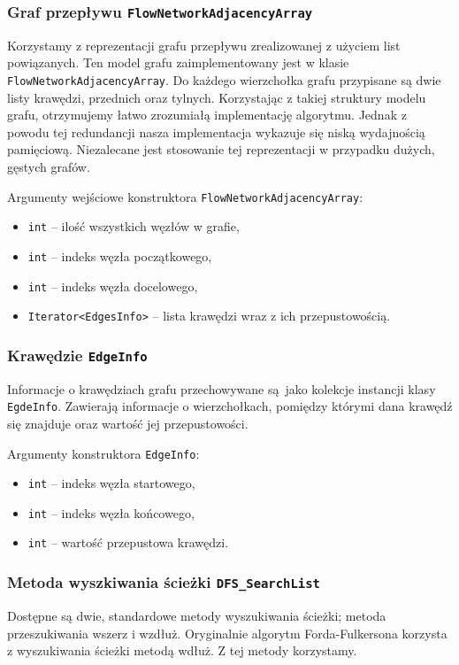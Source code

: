 \documentclass[10pt]{dokument-tiwo}
\begin{document}
\subsubsection{Graf przepływu \texttt{FlowNetworkAdjacencyArray}}
Korzystamy z reprezentacji grafu przepływu zrealizowanej z użyciem list
powiązanych. Ten model grafu zaimplementowany jest w klasie
\texttt{FlowNetworkAdjacencyArray}. Do każdego wierzchołka grafu przypisane są
dwie listy krawędzi, przednich oraz tylnych. Korzystając z takiej struktury
modelu grafu, otrzymujemy łatwo zrozumiałą implementację algorytmu. Jednak z
powodu tej redundancji nasza implementacja wykazuje się niską wydajnością
pamięciową. Niezalecane jest stosowanie tej reprezentacji w przypadku dużych,
gęstych grafów.

\noindent
Argumenty wejściowe konstruktora \texttt{FlowNetworkAdjacencyArray}:
\begin{itemize}[nosep]
  \item \texttt{int} -- ilość wszystkich węzłów w grafie,
  \item \texttt{int} -- indeks węzła początkowego,
  \item \texttt{int} -- indeks węzła docelowego,
  \item \texttt{Iterator<EdgesInfo>} -- lista krawędzi wraz z ich przepustowością.
\end{itemize}

\subsubsection{Krawędzie \texttt{EdgeInfo}}
Informacje o krawędziach grafu przechowywane są jako kolekcje instancji klasy
\texttt{EgdeInfo}. Zawierają informacje o wierzchołkach, pomiędzy którymi
dana krawędź się znajduje oraz wartość jej przepustowości.

\noindent
Argumenty konstruktora \texttt{EdgeInfo}:
\begin{itemize}[nosep]
  \item \texttt{int} -- indeks węzła startowego,
  \item \texttt{int} -- indeks węzła końcowego,
  \item \texttt{int} -- wartość przepustowa krawędzi.
\end{itemize}

\subsubsection{Metoda wyszkiwania ścieżki \texttt{DFS\_SearchList}}
Dostępne są dwie, standardowe metody wyszukiwania ścieżki; metoda przeszukiwania
wszerz i wzdłuż. Oryginalnie algorytm Forda-Fulkersona korzysta z wyszukiwania
ścieżki metodą wdłuż. Z tej metody korzystamy.
\end{document}
